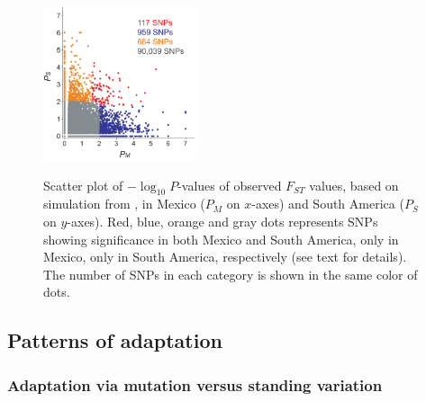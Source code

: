 \begin{figure}[tb]   
  \begin{center}
   \vspace{-0mm}
   \includegraphics[width=0.4\textwidth]{fig/Fig6}
   \renewcommand{\baselinestretch}{0.9}
   \vspace{-3mm}
   \caption{Scatter plot of $-\log_10 P$-values of observed $F_{ST}$ values, based on simulation from , in Mexico ($P_M$ on $x$-axes) and South America ($P_S$ on $y$-axes).  
   Red, blue, orange and gray dots represents SNPs showing significance in both Mexico and South America, only in Mexico, only in South America, respectively (see text for details).
   The number of SNPs in each category is shown in the same color of dots.} 
\vspace{-6mm}
    \label{PvDist}
  \end{center}
\end{figure}
%

\subsection*{Patterns of adaptation}

\subsubsection{Adaptation via mutation versus standing variation}

